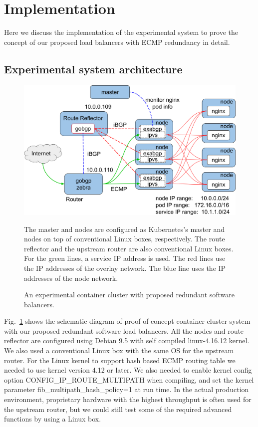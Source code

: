 \section{Implementation}\label{Implementation}

Here we discuss the implementation of the experimental system to prove the concept of our proposed load balancers with ECMP redundancy in detail.

\subsection{Experimental system architecture}

\begin{figure}[tb]
\begin{center}
\includegraphics[width=\columnwidth]{Figs/poc.png}
\end{center}
\caption{An experimental container cluster with proposed redundant software balancers. }
  The master and nodes are configured as Kubernetes's master and nodes on top of conventional Linux boxes, respectively.
  The route reflector and the upstream router are also conventional Linux boxes.
  For the green lines, a service IP address is used. The red lines use the IP addresses of the overlay network. The blue line uses the IP addresses of the node network.
\label{fig:poc}
\end{figure}

Fig.~\ref{fig:poc} shows the schematic diagram of proof of concept container cluster system with our proposed redundant software load balancers.
All the nodes and route reflector are configured using Debian 9.5 with self compiled linux-4.16.12 kernel.  
We also used a conventional Linux box with the same OS for the upstream router.
For the Linux kernel to support hash based ECMP routing table we needed to use kernel version 4.12 or later.
We also needed to enable kernel config option CONFIG\_IP\_ROUTE\_MULTIPATH\cite{ip-sysctl} when compiling, and set the kernel parameter fib\_multipath\_hash\_policy=1 at run time.
In the actual production environment, proprietary hardware with the highest throughput is often used for the upstream router, but we could still test some of the required advanced functions by using a Linux box.

